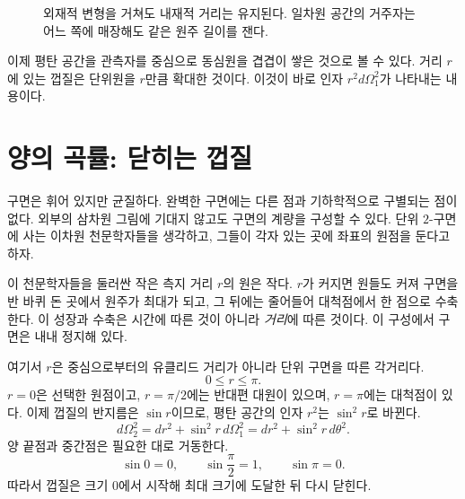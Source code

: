 \begin{figure}[htbp]\centering
{}\caption{외재적 변형을 거쳐도 내재적 거리는 유지된다. 일차원 공간의 거주자는 어느 쪽에 매장해도 같은 원주 길이를 잰다.}\label{fig:c03-intrinsic-redraw}\end{figure}

이제 평탄 공간을 관측자를 중심으로 동심원을 겹겹이 쌓은 것으로 볼 수 있다. 거리 \(r\)에 있는 껍질은 단위원을 \(r\)만큼 확대한 것이다. 이것이 바로 인자 \(r^2d\Omega_1^2\)가 나타내는 내용이다.

\section{양의 곡률: 닫히는 껍질}

구면은 휘어 있지만 균질하다. 완벽한 구면에는 다른 점과 기하학적으로 구별되는 점이 없다. 외부의 삼차원 그림에 기대지 않고도 구면의 계량을 구성할 수 있다. 단위 \(2\)-구면에 사는 이차원 천문학자들을 생각하고, 그들이 각자 있는 곳에 좌표의 원점을 둔다고 하자.

이 천문학자들을 둘러싼 작은 측지 거리 \(r\)의 원은 작다. \(r\)가 커지면 원들도 커져 구면을 반 바퀴 돈 곳에서 원주가 최대가 되고, 그 뒤에는 줄어들어 대척점에서 한 점으로 수축한다. 이 성장과 수축은 시간에 따른 것이 아니라 \emph{거리}에 따른 것이다. 이 구성에서 구면은 내내 정지해 있다.

여기서 \(r\)은 중심으로부터의 유클리드 거리가 아니라 단위 구면을 따른 각거리다.
\[
0 \le r \le \pi.
\]
\(r=0\)은 선택한 원점이고, \(r=\pi/2\)에는 반대편 대원이 있으며, \(r=\pi\)에는 대척점이 있다. 이제 껍질의 반지름은 \(\sin r\)이므로, 평탄 공간의 인자 \(r^2\)는 \(\sin^2r\)로 바뀐다.
\begin{equation}
d\Omega_2^2 = dr^2 + \sin^2 r\, d\Omega_1^2
            = dr^2 + \sin^2 r\, d\theta^2.
\label{eq:c03-two-sphere}
\end{equation}
양 끝점과 중간점은 필요한 대로 거동한다.
\begin{equation}
\sin 0=0,
\qquad
\sin\frac{\pi}{2}=1,
\qquad
\sin\pi=0.
\end{equation}
따라서 껍질은 크기 0에서 시작해 최대 크기에 도달한 뒤 다시 닫힌다.

